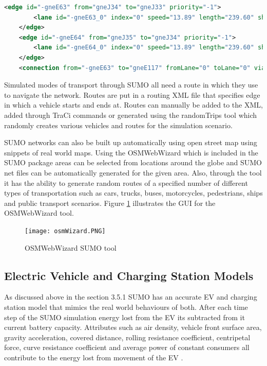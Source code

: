 \documentclass[11pt]{report}
\begin{document}
\begin{lstlisting}[language=XML, caption=Example of SUMO net file XML]
    <edge id="-gneE63" from="gneJ34" to="gneJ33" priority="-1">
        <lane id="-gneE63_0" index="0" speed="13.89" length="239.60" shape="746.80,-501.60 507.20,-501.60"/>
    </edge>
    <edge id="-gneE64" from="gneJ35" to="gneJ34" priority="-1">
        <lane id="-gneE64_0" index="0" speed="13.89" length="239.60" shape="751.60,-257.20 751.60,-496.80"/>
    </edge>
    <connection from="-gneE63" to="gneE117" fromLane="0" toLane="0" via=":gneJ33_0_0" dir="s" state="M"/>
\end{lstlisting}

Simulated modes of transport through SUMO all need a route in which they use to navigate the network. Routes are put in a routing XML file that specifies edge in which a vehicle starts and ends at. Routes can manually be added to the XML, added through TraCi commands or generated using the randomTrips tool which randomly creates various vehicles and routes for the simulation scenario.

SUMO networks can also be built up automatically using open street map using snippets of real world maps. Using the OSMWebWizard which is included in the SUMO package areas can be selected from locations around the globe and SUMO net files can be automatically generated for the given area. Also, through the tool it has the ability to generate random routes of a specified number of different types of transportation such as cars, trucks, buses, motorcycles, pedestrians, ships and public transport scenarios. Figure \ref{fig:7} illustrates the GUI for the OSMWebWizard tool.

\begin{figure}[h!]
  \centering
  \texttt{[image: osmWizard.PNG]}
  \caption{OSMWebWizard SUMO tool}
  \label{fig:7}
\end{figure}

\newpage

\subsection{Electric Vehicle and Charging Station Models}

As discussed above in the section 3.5.1 SUMO has an accurate EV and charging station model that mimics the real world behaviours of both. After each time step of the SUMO simulation energy lost from the EV its subtracted from it current battery capacity. Attributes such as air density, vehicle front surface area, gravity acceleration, covered distance, rolling
resistance coefficient, centripetal force, curve resistance coefficient and average power of constant consumers all contribute to the energy lost from movement of the EV \autocite{kurczveil2013implementation}.
\end{document}
